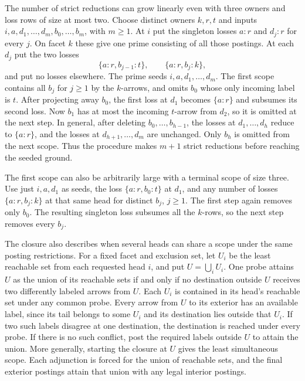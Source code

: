 The number of strict reductions can grow linearly
even with three owners and loss rows of size at
most two. Choose distinct owners $k,r,t$ and inputs
$i,a,d_1,\ldots,d_m,b_0,\ldots,b_m$, with $m\ge1$.
At $i$ put the singleton losses $a:r$ and $d_j:r$
for every $j$. On facet $k$ these give one prime
consisting of all those postings. At each $d_j$
put the two losses
\[
 \{a:r,b_{j-1}:t\},\qquad \{a:r,b_j:k\},
\]
and put no losses elsewhere. The prime seeds
$i,a,d_1,\ldots,d_m$. The first scope contains all
$b_j$ for $j\ge1$ by the $k$-arrows, and omits
$b_0$ whose only incoming label is $t$. After
projecting away $b_0$, the first loss at $d_1$
becomes $\{a:r\}$ and subsumes its second loss.
Now $b_1$ has at most the incoming $t$-arrow from
$d_2$, so it is omitted at the next step. In
general, after deleting $b_0,\ldots,b_{h-1}$, the
losses at $d_1,\ldots,d_h$ reduce to $\{a:r\}$,
and the losses at $d_{h+1},\ldots,d_m$ are
unchanged. Only $b_h$ is omitted from the next
scope. Thus the procedure makes $m+1$ strict
reductions before reaching the seeded ground.

The first scope can also be arbitrarily large
with a terminal scope of size three. Use just
$i,a,d_1$ as seeds, the loss $\{a:r,b_0:t\}$ at
$d_1$, and any number of losses $\{a:r,b_j:k\}$
at that same head for distinct $b_j$, $j\ge1$.
The first step again removes only $b_0$. The
resulting singleton loss subsumes all the
$k$-rows, so the next step removes every $b_j$.

The closure also describes when several heads can
share a scope under the same posting restrictions.
For a fixed facet and exclusion set, let $U_i$ be
the least reachable set from each requested head
$i$, and put $U=\bigcup_i U_i$. One probe attains
$U$ as the union of its reachable sets if and only
if no destination outside $U$ receives two
differently labeled arrows from $U$. Each $U_i$
is contained in its head's reachable set under
any common probe. Every arrow from $U$ to its
exterior has an available label, since its tail
belongs to some $U_i$ and its destination lies
outside that $U_i$. If two such labels disagree
at one destination, the destination is reached
under every probe. If there is no such conflict,
post the required labels outside $U$ to attain
the union. More generally, starting the closure
at $U$ gives the least simultaneous scope. Each
adjunction is forced for the union of reachable
sets, and the final exterior postings attain
that union with any legal interior postings.

